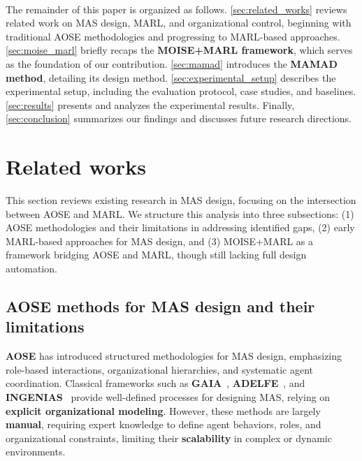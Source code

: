 \documentclass[pdflatex,sn-mathphys-num]{sn-jnl}%
\theoremstyle{thmstyleone}%
\theoremstyle{thmstyletwo}%
\theoremstyle{thmstylethree}%
\begin{document}
\

The remainder of this paper is organized as follows. \autoref{sec:related_works} reviews related work on MAS design, MARL, and organizational control, beginning with traditional AOSE methodologies and progressing to MARL-based approaches. \autoref{sec:moise_marl} briefly recaps the \textbf{MOISE+MARL framework}, which serves as the foundation of our contribution. \autoref{sec:mamad} introduces the \textbf{MAMAD method}, detailing its design method. \autoref{sec:experimental_setup} describes the experimental setup, including the evaluation protocol, case studies, and baselines. \autoref{sec:results} presents and analyzes the experimental results. Finally, \autoref{sec:conclusion} summarizes our findings and discusses future research directions.

\clearpage

\section{Related works}\label{sec:related_works}

This section reviews existing research in MAS design, focusing on the intersection between AOSE and MARL. We structure this analysis into three subsections: (1) AOSE methodologies and their limitations in addressing identified gaps, (2) early MARL-based approaches for MAS design, and (3) MOISE+MARL as a framework bridging AOSE and MARL, though still lacking full design automation.

\subsection{AOSE methods for MAS design and their limitations}

\textbf{AOSE} has introduced structured methodologies for MAS design, emphasizing role-based interactions, organizational hierarchies, and systematic agent coordination. Classical frameworks such as \textbf{GAIA}~\cite{gaia1998}, \textbf{ADELFE}~\cite{adelfe2002}, and \textbf{INGENIAS}~\cite{ingenias2004} provide well-defined processes for designing MAS, relying on \textbf{explicit organizational modeling}. However, these methods are largely \textbf{manual}, requiring expert knowledge to define agent behaviors, roles, and organizational constraints, limiting their \textbf{scalability} in complex or dynamic environments.
\end{document}
